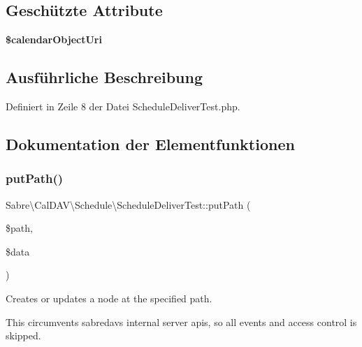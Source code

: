\subsection*{Geschützte Attribute}
\begin{DoxyCompactItemize}
\item 
\mbox{\label{class_sabre_1_1_cal_d_a_v_1_1_schedule_1_1_schedule_deliver_test_add5133b5d6448acf1a392736df35317b}} 
{\bfseries \$calendar\+Object\+Uri}
\end{DoxyCompactItemize}


\subsection{Ausführliche Beschreibung}


Definiert in Zeile 8 der Datei Schedule\+Deliver\+Test.\+php.



\subsection{Dokumentation der Elementfunktionen}
\mbox{\label{class_sabre_1_1_cal_d_a_v_1_1_schedule_1_1_schedule_deliver_test_a8e698a592d8c9853ec1af8acad65b2d5}} 
\subsubsection{\texorpdfstring{put\+Path()}{putPath()}}
{\footnotesize\ttfamily Sabre\textbackslash{}\+Cal\+D\+A\+V\textbackslash{}\+Schedule\textbackslash{}\+Schedule\+Deliver\+Test\+::put\+Path (\begin{DoxyParamCaption}\item[{}]{\$path,  }\item[{}]{\$data }\end{DoxyParamCaption})}

Creates or updates a node at the specified path.

This circumvents sabredav\textquotesingle{}s internal server apis, so all events and access control is skipped.


